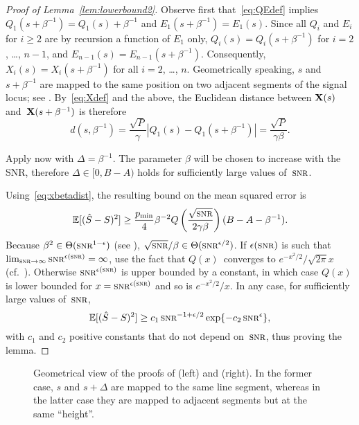 \begin{proof}[Proof of Lemma~\ref{lem:lowerbound2}]
  Observe first that~\eqref{eq:QEdef} implies $Q_1(s + \beta^{-1}) = Q_1(s) +
  \beta^{-1}$ and $E_1(s + \beta^{-1}) = E_1(s)$. Since all $Q_i$ and $E_i$ for
  $i \ge 2$ are by recursion a function of $E_1$ only, $Q_i(s) = Q_i(s +
  \beta^{-1})$ for $i = 2$, \dots, $n-1$, and $E_{n-1}(s) = E_{n-1}(s +
  \beta^{-1})$. Consequently,  $X_i(s) = X_i(s + \beta^{-1})$ for all $i =
  2$, \dots, $n$. Geometrically speaking, $s$ and $s + \beta^{-1}$ are mapped to
  the same position on two adjacent segments of the signal locus; see
  . By~\eqref{eq:Xdef} and the above, the Euclidean distance
  between $\mathbf{X}(s)$ and~$\mathbf{X}(s+\beta^{-1})$ is therefore
  \begin{equation}
    \label{eq:xbetadist}
    d(s, \beta^{-1}) = \frac{\sqrt P}{\gamma} |Q_1(s) - Q_1(s+\beta^{-1})| 
    = \frac{\sqrt P}{\gamma\beta}.
  \end{equation}

  Apply now  with $\Delta = \beta^{-1}$. The
  parameter $\beta$ will be chosen to increase with the SNR, therefore $\Delta
  \in [0, B-A)$ holds for sufficiently large values of~$\snr$.

  Using~\eqref{eq:xbetadist}, the resulting bound on the mean squared error is
  \begin{equation*}
    \mse \ge \frac{\pmin}{4} \beta^{-2}
    Q\left (\frac{\sqrt{\snr}}{2\gamma\beta}  \right) (B-A-\beta^{-1}
    ).
  \end{equation*}
  Because $\beta^2 \in \Theta(\snr^{1-\e})$ (see ),
  $\sqrt{\snr}/\beta \in \Theta(\snr^{\e/2})$. If $\e(\snr)$ is such that
  $\limtoinf{\snr} \snr^{\e(\snr)} = \infty$, use the fact that $Q(x)$~converges
  to $e^{-x^2/2}/\sqrt{2\pi}x$ (cf.~\cite[.12]{AbramowitzS1964}).
  Otherwise $\snr^{\e(\snr)}$ is upper bounded by a constant, in which case
  $Q(x)$ is lower bounded for $x = \snr^{\e(\snr)}$ and so is $e^{-x^2/2}/x$.
  In any case, for sufficiently large values of~$\snr$,
  \begin{equation*}
    \mse \ge c_1 \snr^{-1 + \e/2} \exp\{-c_2\snr^\e\},
  \end{equation*}
  with $c_1$ and $c_2$ positive constants that do not depend on~$\snr$, thus
  proving the lemma.
\end{proof}

\begin{figure}
  \centerline{%
  \subfloat[$\Delta \in [0, \beta^{-(n-1)})$]%
  {\label{fig:sdrubproofa}\figbox[4cm]{sdrubproofa}}%
  \hfil
  } %
  \caption{Geometrical view of the proofs of  (left) and
   (right). In the former case, $s$ and $s + \Delta$ are
  mapped to the same line segment, whereas in the latter case they are mapped to
  adjacent segments but at the same ``height''.}
  \label{fig:sdrubproof}
\end{figure}

